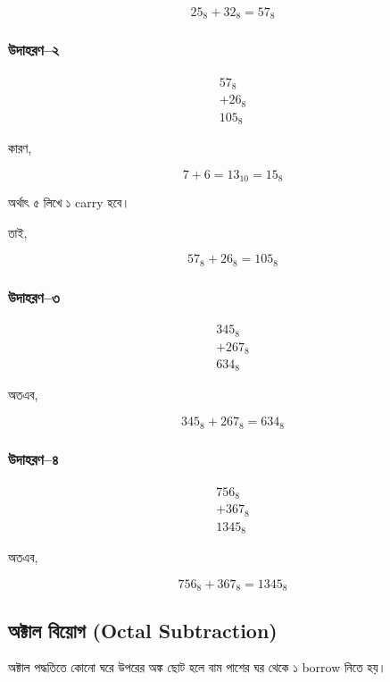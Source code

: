 \[
\boxed{25_8+32_8=57_8}
\]

\subsubsection*{উদাহরণ--২}

\[
\begin{array}{r}
57_8\\
+26_8\\
\hline
105_8
\end{array}
\]

কারণ,

\[
7+6=13_{10}=15_8
\]

অর্থাৎ ৫ লিখে ১
\textenglish{carry} হবে।

তাই,

\[
\boxed{57_8+26_8=105_8}
\]

\subsubsection*{উদাহরণ--৩}

\[
\begin{array}{r}
345_8\\
+267_8\\
\hline
634_8
\end{array}
\]

অতএব,

\[
\boxed{345_8+267_8=634_8}
\]

\subsubsection*{উদাহরণ--৪}

\[
\begin{array}{r}
756_8\\
+367_8\\
\hline
1345_8
\end{array}
\]

অতএব,

\[
\boxed{756_8+367_8=1345_8}
\]


\subsection{অক্টাল বিয়োগ
(\textenglish{Octal Subtraction})}

অক্টাল পদ্ধতিতে কোনো ঘরে উপরের অঙ্ক ছোট হলে
বাম পাশের ঘর থেকে ১
\textenglish{borrow} নিতে হয়।

